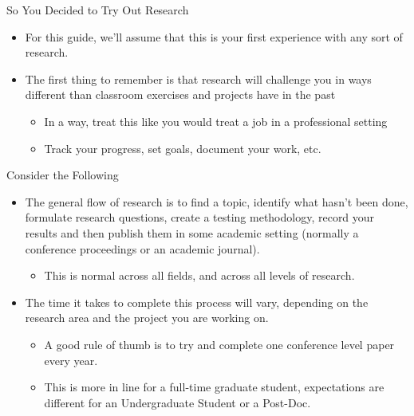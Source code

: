 \documentclass[handout]{beamer}
\begin{document}
\begin{frame}{So You Decided to Try Out Research}
\begin{itemize}
  \item For this guide, we'll assume that this is your first experience with any sort of research. 
  \item The first thing to remember is that research will challenge you in ways different than classroom exercises and projects have in the past
  \begin{itemize}
      \item In a way, treat this like you would treat a job in a professional setting
      \item Track your progress, set goals, document your work, etc.
  \end{itemize}
\end{itemize}
\end{frame}

\begin{frame}{Consider the Following}
\begin{itemize}
  \item The general flow of research is to find a topic, identify what hasn't been done, formulate research questions, create a testing methodology, record your results and then publish them in some academic setting (normally a conference proceedings or an academic journal).
  \begin{itemize}
      \item This is normal across all fields, and across all levels of research. 
  \end{itemize}
  \item The time it takes to complete this process will vary, depending on the research area and the project you are working on. 
  \begin{itemize}
      \item A good rule of thumb is to try and complete one conference level paper every year.
      \item This is more in line for a full-time graduate student, expectations are different for an Undergraduate Student or a Post-Doc.
    \end{itemize}
  \end{itemize}
\end{frame}
\end{document}
